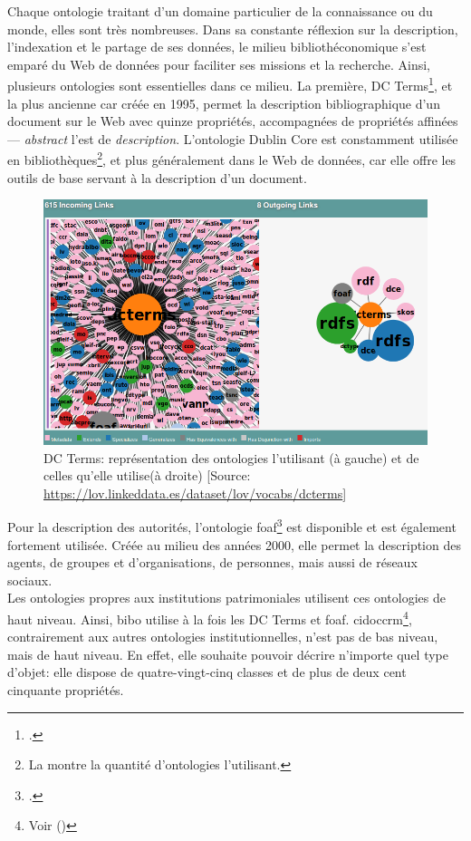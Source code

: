 Chaque ontologie traitant d'un domaine particulier de la connaissance ou du monde, elles sont très nombreuses. Dans sa constante réflexion sur la description, l'indexation et le partage de ses données, le milieu bibliothéconomique s'est emparé du Web de données pour faciliter ses missions et la recherche. Ainsi, plusieurs ontologies sont essentielles dans ce milieu. La première, DC Terms\footcite{noauthor_dublin_nodate}, et la plus ancienne car créée en 1995, permet la description bibliographique d'un document sur le Web avec quinze propriétés, accompagnées de propriétés affinées --- \textit{abstract} l'est de \textit{description}. L'ontologie Dublin Core est constamment utilisée en bibliothèques\footnote{La  montre la quantité d'ontologies l'utilisant.}, et plus généralement dans le Web de données, car elle offre les outils de base servant à la description d'un document.
\begin{figure}[!h]
	\centering
	\includegraphics[width=13cm]{images/onto_dcterms.png}
	\caption[L'ontologie DC Terms]{DC Terms: représentation des ontologies l'utilisant (à gauche) et de celles qu'elle utilise(à droite) [Source: \url{https://lov.linkeddata.es/dataset/lov/vocabs/dcterms}]}
	\label{onto_dcterms}
\end{figure}
\medskip

Pour la description des autorités, l'ontologie \ac{foaf}\footcite{noauthor_foaf_nodate} est disponible et est également fortement utilisée. Créée au milieu des années 2000, elle permet la description des agents, de groupes et d'organisations, de personnes, mais aussi de réseaux sociaux.\\

Les ontologies propres aux institutions patrimoniales utilisent ces ontologies de haut niveau. Ainsi, \ac{bibo} utilise à la fois les DC Terms et \ac{foaf}. \ac{cidoccrm}\footnote{Voir  ()}, contrairement aux autres ontologies institutionnelles, n'est pas de bas niveau, mais de haut niveau. En effet, elle souhaite pouvoir décrire n'importe quel type d'objet: elle dispose de quatre-vingt-cinq classes et de plus de deux cent cinquante propriétés.